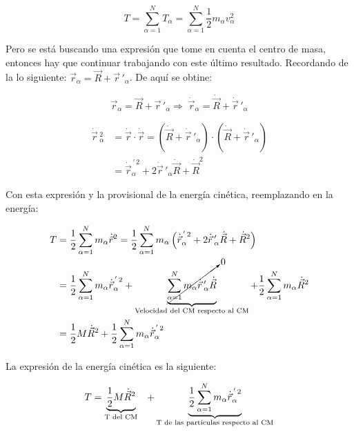 \documentclass[/home/hernan/Documentos/Apuntes_mecanica_teorica/main.tex]{subfiles}
\begin{document}
	\begin{equation*}
		T = \sum_{\alpha =1}^{N} T_{\alpha} = \sum_{\alpha =1}^{N} \frac{1}{2} m_{\alpha}v_{\alpha}^{2}	
	\end{equation*}

	Pero se está buscando una expresión que tome en cuenta el centro de masa, entonces hay que continuar trabajando con este último resultado. Recordando de la  lo siguiente: $\vec{r}_{\alpha} = \vec{R} + {\vec{r}}\,'_{\alpha}$. De aquí se obtine:

	\begin{equation*}
		\vec{r}_{\alpha} = \vec{R} + {\vec{r}}\,'_{\alpha} \Rightarrow \; \dot{\vec{r}}_{\alpha} = \dot{\vec{R}} + {\dot{\vec{r}}}\,'_{\alpha}
	\end{equation*}

	\begin{align*}
		\dot{\vec{r}}\,^{2}_{\alpha} &= \dot{\vec{r}} \cdot \dot{\vec{r}} = \left( \dot{\vec{R}} + {\dot{\vec{r}}}\,'_{\alpha} \right) \cdot \left( \dot{\vec{R}} + {\dot{\vec{r}}}\,'_{\alpha} \right) \\ 
		& = {\dot{\vec{r}}}^{\,'\,2}_{\alpha} + 2 {\dot{\vec{r}}}\,'_{\alpha} \dot{\vec{R}} + \dot{\vec{R}}^{2}
	\end{align*}

	Con esta expresión y la provisional de la energía cinética, reemplazando en la energía:

	\begin{align*}
		T & = \frac{1}{2} \sum_{\alpha =1}^{N} m_{\alpha} \dot{\vec{r}}^{2} = \frac{1}{2} \sum_{\alpha =1}^{N} m_{\alpha} \left( {\dot{\vec{r}}}^{\,'\,2}_{\alpha} + 2 {\dot{\vec{r}}}\,'_{\alpha} \dot{\vec{R}} + \dot{\vec{R}}^{2}\right) \\ 
		& = \frac{1}{2} \sum_{\alpha =1}^{N} m_{\alpha} {\dot{\vec{r}}}^{\,'\,2}_{\alpha} + \underbrace{\cancelto{0}{\sum_{\alpha =1}^{N} m_{\alpha} {\dot{\vec{r}}}\,'_{\alpha} \dot{\vec{R}}}}_{\textup{Velocidad del CM respecto al CM}} + \frac{1}{2} \sum_{\alpha =1}^{N} m_{\alpha} \dot{\vec{R}}^{2} \\ 
		& = \frac{1}{2} M \dot{\vec{R}}^{2} + \frac{1}{2} \sum_{\alpha =1}^{N} m_{\alpha} {\dot{\vec{r}}}^{\,'\,2}_{\alpha}
	\end{align*}

	\newpage

	\begin{definition} 
		La expresión de la energía cinética es la siguiente:

		\begin{equation}
			T = \underbrace{\frac{1}{2} M \dot{\vec{R}}^{2}}_{\textup{T del CM}} \; \; \; + \underbrace{\frac{1}{2} \sum_{\alpha =1}^{N} m_{\alpha} {\dot{\vec{r}}}^{\,'\,2}_{\alpha}}_{\textup{T de las partículas respecto al CM}}
			\label{eq: sisT}
		\end{equation}
	\end{definition}
\end{document}
